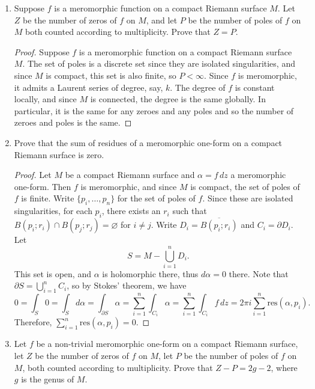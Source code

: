 \documentclass[11pt,oneside,english]{amsart}
\theoremstyle{definition}
\newcommand{\lspace}{\vspace{5mm}}
\begin{document}
\rightline{\today}

\lspace




\begin{enumerate}[leftmargin=*]
\itemsep5mm

\item Suppose $f$ is a meromorphic function on a compact Riemann surface $M$. Let $Z$ be the number of zeros of $f$ on $M$, and let $P$ be the number of poles of $f$ on $M$ both counted according to multiplicity. Prove that  $Z=P$.

\begin{proof}
Suppose $f$ is a meromorphic function on a compact Riemann surface $M$. The set of poles is a discrete set since they are isolated singularities, and since $M$ is compact, this set is also finite, so $P<\infty$. Since $f$ is meromorphic, it admits a Laurent series of degree, say, $k$. The degree of $f$ is constant locally, and since $M$ is connected, the degree is the same globally. In particular, it is the same for any zeroes and any poles and so the number of zeroes and poles is the same.
\end{proof}


\item Prove that the sum of residues of a meromorphic one-form on a compact Riemann surface is zero.

\begin{proof}
Let $M$ be a compact Riemann surface and $\alpha=f\,dz$ a meromorphic one-form. Then $f$ is meromorphic, and since $M$ is compact, the set of poles of $f$ is finite. Write $\{p_i,\ldots,p_n\}$ for the set of poles of $f$. Since these are isolated singularities, for each $p_i$, there exists an $r_i$ such that $B(p_i;r_i)\cap B(p_j;r_j)=\varnothing$ for $i\neq j$. Write $D_i=\overline{B(p_i;r_i)}$ and $C_i=\partial D_i$. Let 
\[
S=M-\bigcup_{i=1}^nD_i.
\]
This set is open, and $\alpha$ is holomorphic there, thus $d\alpha=0$ there. Note that $\partial S=\bigcup_{i=1}^nC_i$, so by Stokes' theorem, we have
\[
0=\int_S0=\int_Sd\alpha=\int_{\partial S}\alpha=\sum_{i=1}^n\int_{C_i}\alpha=\sum_{i=1}^n\int_{C_i}f\,dz=2\pi i\sum_{i=1}^n\text{res}(\alpha,p_i).
\]
Therefore, $\sum_{i=1}^n\text{res}(\alpha,p_i)=0$.
\end{proof}

\pagebreak

\item Let $f$ be a non-trivial meromorphic one-form on a compact Riemann surface, let $Z$ be the number of zeros of $f$ on $M$, let $P$ be the number of poles of $f$ on $M$, both counted according to multiplicity. Prove that $Z-P=2g-2$, where $g$ is the genus of $M$. 


\end{enumerate}
\end{document}
